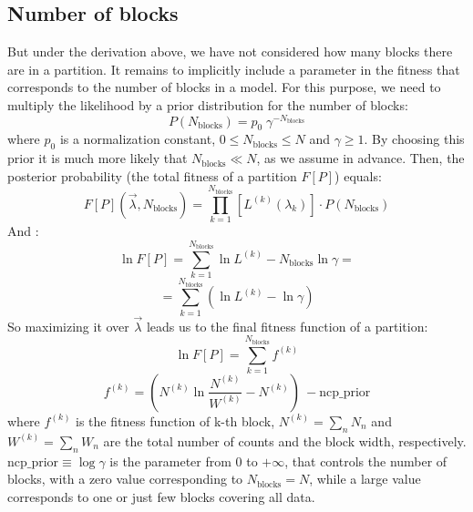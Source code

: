 \documentclass{article}
\begin{document}
\subsection{Number of blocks}
But under the derivation above, we have not considered how many blocks there are in a partition. It remains to implicitly include a parameter in the fitness that corresponds to the number of blocks in a model. For this purpose, we need to multiply the likelihood by a prior distribution for the number of blocks:
\begin{equation}
P(N_{\text{blocks}})=p_0\;\gamma^{-N_{\text{blocks}}}
\end{equation}
where $p_0$ is a normalization constant,  $0\le N_{\text{blocks}}\le N$ and $\gamma\ge 1$. By choosing this prior it is much more likely that $N_{\text{blocks}}\ll N$, as we assume in advance. Then, the posterior probability (the total fitness of a partition $F[P]$) equals:
\begin{equation}
    F[P](\vec{\lambda}, N_{\text{blocks}})=\prod\limits_{k=1}^{N_{\text{blocks}}}\left[L^{(k)}(\lambda_k)\right]\cdot P(N_{\text{blocks}})
\end{equation}
And :
\begin{equation}
    \ln F[P]=\sum\limits_{k=1}^{N_{\text{blocks}}}\ln L^{(k)}-N_{\text{blocks}}\ln\gamma=
\end{equation}
\begin{equation*}
=\sum\limits_{k=1}^{N_{\text{blocks}}}\left(\ln L^{(k)}-\ln\gamma\right)
\end{equation*}
So maximizing it over $\vec{\lambda}$ leads us to the final fitness function of a partition: 
\begin{equation}
    \ln F[P] = \sum\limits_{k=1}^{N_{\text{blocks}}}f^{(k)} 
\end{equation}
\begin{equation}
f^{(k)}=\left(N^{(k)}\ln\frac{N^{(k)}}{W^{(k)}}-N^{(k)} \right)\ - \text{ncp\_prior}
\end{equation}
where $f^{(k)}$ is the fitness function of k-th block, $N^{(k)}=\sum_n N_n$ and $W^{(k)}=\sum_n W_n$ are the total number of counts and the block width, respectively. $\text{ncp\_prior} \equiv \log\gamma$ is the parameter from 0 to $+\infty$, that controls the number of blocks, with a zero value corresponding to $N_{\text{blocks}}=N$, while a large value corresponds to one or just few blocks covering all data.
\end{document}
